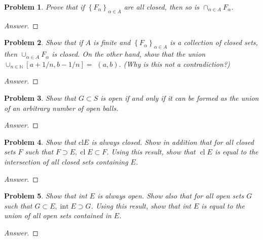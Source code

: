 \documentclass{article}
\newtheorem{problem}{Problem}
\begin{document}
\begin{problem}
Prove that if $\left\{F_{\alpha}\right\}_{\alpha \in A}$ are all closed, then so is $\cap_{\alpha \in A} F_{\alpha}$.
\end{problem}

\begin{proof}[Answer]
    
\end{proof}

\begin{problem}
Show that if $A$ is finite and $\left\{F_{\alpha}\right\}_{\alpha \in A}$ is a collection of closed sets, then $\cup_{\alpha \in A} F_{\alpha}$ is closed. On the other hand, show that the union $\cup_{n \in \mathbb{N}}[a+1 / n, b-1 / n]=$ $(a, b)$. (Why is this not a contradiction?)
\end{problem}

\begin{proof}[Answer]
    
\end{proof}

\begin{problem}
Show that $G \subset S$ is open if and only if it can be formed as the union of an arbitrary number of open balls.
\end{problem}

\begin{proof}[Answer]
    
\end{proof}

\begin{problem}
Show that $\mathrm{cl} E$ is always closed. Show in addition that for all closed sets $F$ such that $F \supset E, \operatorname{cl} E \subset F$. Using this result, show that $\operatorname{cl} E$ is equal to the intersection of all closed sets containing $E$.
\end{problem}

\begin{proof}[Answer]
    
\end{proof}

\begin{problem}
Show that int $E$ is always open. Show also that for all open sets $G$ such that $G \subset E, \operatorname{int} E \supset G$. Using this result, show that int $E$ is equal to the union of all open sets contained in $E$.
\end{problem}

\begin{proof}[Answer]
    
\end{proof}
\end{document}
